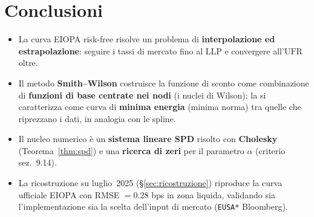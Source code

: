 \documentclass[11pt,a4paper]{article}
\theoremstyle{plain}
\theoremstyle{definition}
\theoremstyle{remark}
\newcommand{\UFR}{\ensuremath{\mathrm{UFR}}}
\newcommand{\LLP}{\ensuremath{\mathrm{LLP}}}
\begin{document}
\section{Conclusioni}

\begin{itemize}
  \item La curva EIOPA risk-free risolve un problema di \textbf{interpolazione ed
        estrapolazione}: seguire i tassi di mercato fino al $\LLP$ e convergere all'$\UFR$ oltre.
  \item Il metodo \textbf{Smith--Wilson} costruisce la funzione di sconto come combinazione di
        \textbf{funzioni di base centrate nei nodi} (i nuclei di Wilson); la si caratterizza come curva di \textbf{minima energia}
        (minima norma) tra quelle che riprezzano i dati, in analogia con le spline.
  \item Il nucleo numerico \`e un \textbf{sistema lineare SPD} risolto con \textbf{Cholesky}
        (Teorema~\ref{thm:spd}) e una \textbf{ricerca di zeri} per il parametro $\alpha$
        (criterio sez.~9.14).
  \item La ricostruzione su luglio~2025 (§\ref{sec:ricostruzione}) riproduce la curva ufficiale
        EIOPA con RMSE $= 0.28$ bps in zona liquida, validando sia l'implementazione sia la
        scelta dell'input di mercato (\texttt{EUSA*} Bloomberg).
\end{itemize}
\end{document}
